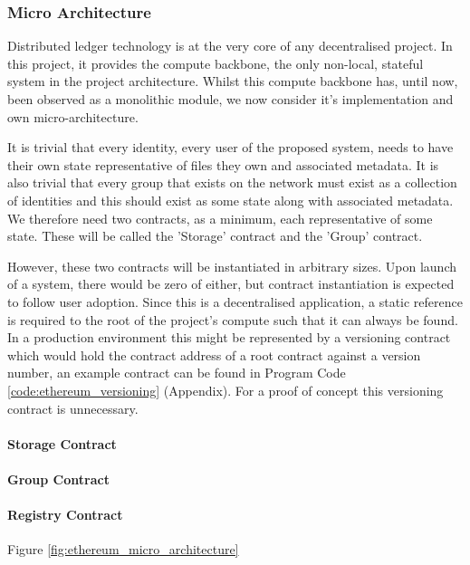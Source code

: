 \subsubsection{Micro Architecture}

Distributed ledger technology is at the very core of any decentralised project. In this project, it provides the compute backbone, the only non-local, stateful system in the project architecture. Whilst this compute backbone has, until now, been observed as a monolithic module, we now consider it's implementation and own micro-architecture.

It is trivial that every identity, every user of the proposed system, needs to have their own state representative of files they own and associated metadata. It is also trivial that every group that exists on the network must exist as a collection of identities and this should exist as some state along with associated metadata. We therefore need two contracts, as a minimum, each representative of some state. These will be called the 'Storage' contract and the 'Group' contract.

However, these two contracts will be instantiated in arbitrary sizes. Upon launch of a system, there would be zero of either, but contract instantiation is expected to follow user adoption. Since this is a decentralised application, a static reference is required to the root of the project's compute such that it can always be found. In a production environment this might be represented by a versioning contract which would hold the contract address of a root contract against a version number, an example contract can be found in Program Code \ref{code:ethereum_versioning} (Appendix). For a proof of concept this versioning contract is unnecessary. 

\paragraph{Storage Contract}

\paragraph{Group Contract}

\paragraph{Registry Contract}




Figure \ref{fig:ethereum_micro_architecture}
